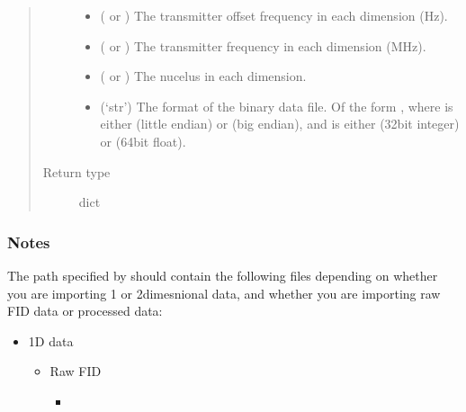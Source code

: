 \documentclass[letterpaper,10pt,english]{sphinxmanual}
\begin{document}
\begin{fulllineitems}
\begin{quote}
\begin{description}
\begin{itemize}
\item {} 
\sphinxAtStartPar
{} (\sphinxtitleref{{[}float{]}} or ) \sphinxhyphen{} The transmitter
offset frequency in each dimension (Hz).

\item {} 
\sphinxAtStartPar
{} (\sphinxtitleref{{[}float{]}} or ) \sphinxhyphen{} The
transmitter frequency in each dimension (MHz).

\item {} 
\sphinxAtStartPar
{} (\sphinxtitleref{{[}str{]}} or ) \sphinxhyphen{} The nucelus in each
dimension.

\item {} 
\sphinxAtStartPar
{} (‘str’) \sphinxhyphen{} The format of the binary data file.
Of the form , where  is either
 (little endian) or  (big endian), and 
is either  (32\sphinxhyphen{}bit integer) or  (64\sphinxhyphen{}bit float).

\end{itemize}


\item[{Return type}] \leavevmode
\sphinxAtStartPar
dict

\end{description}\end{quote}
\subsubsection*{Notes}

\sphinxAtStartPar
{}

\sphinxAtStartPar
The path specified by  should
contain the following files depending on whether you are importing 1\sphinxhyphen{} or
2\sphinxhyphen{}dimesnional data, and whether you are importing raw FID data or
processed data:
\begin{itemize}
\item {} 
\sphinxAtStartPar
1D data
\begin{itemize}
\item {} 
\sphinxAtStartPar
Raw FID
\begin{itemize}
\item {} 
\sphinxAtStartPar
{}


\end{itemize}
\end{itemize}
\end{itemize}
\end{fulllineitems}
\end{document}
